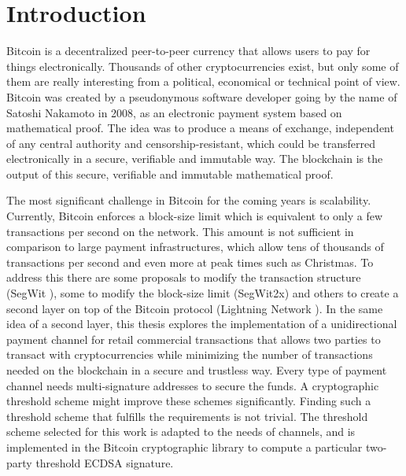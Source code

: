 \chapter{Introduction}
\label{chap:introduction}

Bitcoin is a decentralized peer-to-peer currency that allows users to pay for
things electronically. Thousands of other cryptocurrencies exist, but only some
of them are really interesting from a political, economical or technical point
of view. Bitcoin was created by a pseudonymous software developer going by the
name of Satoshi Nakamoto in 2008, as an electronic payment system based on
mathematical proof. The idea was to produce a means of exchange, independent of
any central authority and censorship-resistant, which could be transferred
electronically in a secure, verifiable and immutable way. The blockchain is the
output of this secure, verifiable and immutable mathematical proof.

The most significant challenge in Bitcoin for the coming years is scalability.
Currently, Bitcoin enforces a block-size limit which is equivalent to only a few
transactions per second on the network. This amount is not sufficient in
comparison to large payment infrastructures, which allow tens of thousands of
transactions per second and even more at peak times such as Christmas.  To
address this there are some proposals to modify the transaction structure (SegWit \cite{SegWitBIP}),
some to modify the block-size limit (SegWit2x) and others to
create a second layer on top of the Bitcoin protocol (Lightning Network \cite{poon2016bitcoin}).
In the same idea of a second layer, this thesis explores the
implementation of a unidirectional payment channel for retail commercial
transactions that allows two parties to
transact with cryptocurrencies while minimizing the number of transactions needed
on the blockchain in a secure and trustless way. Every type of payment channel needs
multi-signature addresses to secure the funds. A cryptographic threshold scheme
might improve these schemes significantly. Finding such a threshold scheme that
fulfills the requirements is not trivial. The threshold scheme selected for this work is
adapted to the needs of channels, and is implemented in the Bitcoin cryptographic
library to compute a particular two-party threshold ECDSA signature.

